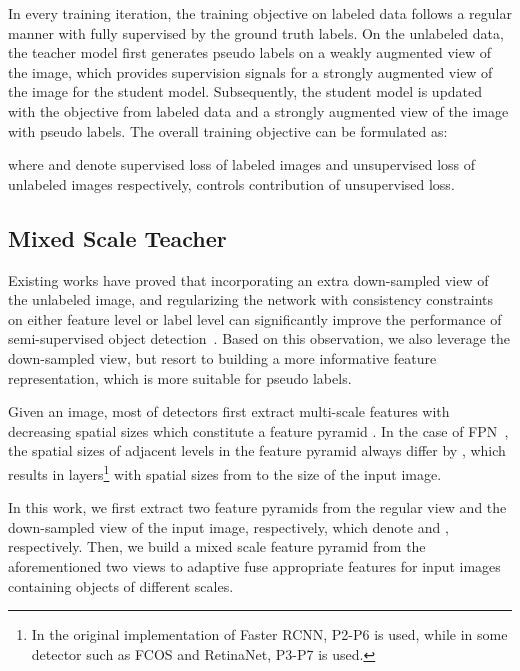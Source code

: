 \documentclass[10pt,twocolumn,letterpaper]{article}
\begin{document}
In every training iteration, the training objective on labeled data follows a regular manner with fully supervised by the ground truth labels. On the unlabeled data, the teacher model first generates pseudo labels on a weakly augmented view of the image, which provides supervision signals for a strongly augmented view of the image for the student model. Subsequently, the student model is updated with the objective from labeled data and a strongly augmented view of the image with pseudo labels. The overall training objective can be formulated as:

where  and  denote supervised loss of labeled images and unsupervised loss of unlabeled images respectively,  controls contribution of unsupervised loss. 











\subsection{Mixed Scale Teacher}






Existing works have proved that incorporating an extra down-sampled view of the unlabeled image, and regularizing the network with consistency constraints on either feature level or label level can significantly improve the performance of semi-supervised object detection~\cite{sed, pseco}. Based on this observation, we also leverage the down-sampled view, but resort to building a more informative feature representation, which is more suitable for pseudo labels. 

Given an image, most of detectors first extract multi-scale features  with decreasing spatial sizes which constitute a feature pyramid . In the case of FPN~\cite{fpn}, the spatial sizes of adjacent levels in the feature pyramid always differ by , which results in  layers\footnote{In the original implementation of Faster RCNN, P2-P6 is used, while in some detector such as FCOS and RetinaNet, P3-P7 is used.} with spatial sizes from  to  \wrt the size of the input image. 

In this work, we first extract two feature pyramids from the regular view and the down-sampled view of the input image, respectively, which denote  and , respectively. Then, we build a mixed scale feature pyramid  from the aforementioned two views to adaptive fuse appropriate features for input images containing objects of different scales. 
\end{document}
